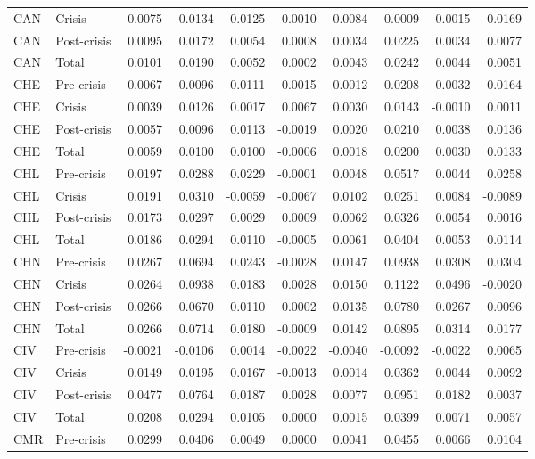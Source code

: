 \begin{longtable}[t]{llrrrrrrrr}
CAN & Crisis & 0.0075 & 0.0134 & -0.0125 & -0.0010 & 0.0084 & 0.0009 & -0.0015 & -0.0169\\
CAN & Post-crisis & 0.0095 & 0.0172 & 0.0054 & 0.0008 & 0.0034 & 0.0225 & 0.0034 & 0.0077\\
CAN & Total & 0.0101 & 0.0190 & 0.0052 & 0.0002 & 0.0043 & 0.0242 & 0.0044 & 0.0051\\
\addlinespace
CHE & Pre-crisis & 0.0067 & 0.0096 & 0.0111 & -0.0015 & 0.0012 & 0.0208 & 0.0032 & 0.0164\\
CHE & Crisis & 0.0039 & 0.0126 & 0.0017 & 0.0067 & 0.0030 & 0.0143 & -0.0010 & 0.0011\\
CHE & Post-crisis & 0.0057 & 0.0096 & 0.0113 & -0.0019 & 0.0020 & 0.0210 & 0.0038 & 0.0136\\
CHE & Total & 0.0059 & 0.0100 & 0.0100 & -0.0006 & 0.0018 & 0.0200 & 0.0030 & 0.0133\\
CHL & Pre-crisis & 0.0197 & 0.0288 & 0.0229 & -0.0001 & 0.0048 & 0.0517 & 0.0044 & 0.0258\\
\addlinespace
CHL & Crisis & 0.0191 & 0.0310 & -0.0059 & -0.0067 & 0.0102 & 0.0251 & 0.0084 & -0.0089\\
CHL & Post-crisis & 0.0173 & 0.0297 & 0.0029 & 0.0009 & 0.0062 & 0.0326 & 0.0054 & 0.0016\\
CHL & Total & 0.0186 & 0.0294 & 0.0110 & -0.0005 & 0.0061 & 0.0404 & 0.0053 & 0.0114\\
CHN & Pre-crisis & 0.0267 & 0.0694 & 0.0243 & -0.0028 & 0.0147 & 0.0938 & 0.0308 & 0.0304\\
CHN & Crisis & 0.0264 & 0.0938 & 0.0183 & 0.0028 & 0.0150 & 0.1122 & 0.0496 & -0.0020\\
\addlinespace
CHN & Post-crisis & 0.0266 & 0.0670 & 0.0110 & 0.0002 & 0.0135 & 0.0780 & 0.0267 & 0.0096\\
CHN & Total & 0.0266 & 0.0714 & 0.0180 & -0.0009 & 0.0142 & 0.0895 & 0.0314 & 0.0177\\
CIV & Pre-crisis & -0.0021 & -0.0106 & 0.0014 & -0.0022 & -0.0040 & -0.0092 & -0.0022 & 0.0065\\
CIV & Crisis & 0.0149 & 0.0195 & 0.0167 & -0.0013 & 0.0014 & 0.0362 & 0.0044 & 0.0092\\
CIV & Post-crisis & 0.0477 & 0.0764 & 0.0187 & 0.0028 & 0.0077 & 0.0951 & 0.0182 & 0.0037\\
\addlinespace
CIV & Total & 0.0208 & 0.0294 & 0.0105 & 0.0000 & 0.0015 & 0.0399 & 0.0071 & 0.0057\\
CMR & Pre-crisis & 0.0299 & 0.0406 & 0.0049 & 0.0000 & 0.0041 & 0.0455 & 0.0066 & 0.0104\\

\end{longtable}

